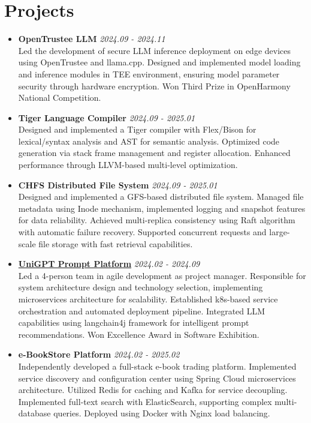 \documentclass[a4paper]{article}
\begin{document}
\section*{Projects}
\begin{itemize}[leftmargin=*,label={},itemsep=0.5em,topsep=0.2em]
\item \textbf{OpenTrustee LLM} \hfill \textit{2024.09 - 2024.11}\\
Led the development of secure LLM inference deployment on edge devices using OpenTrustee and llama.cpp. Designed and implemented model loading and inference modules in TEE environment, ensuring model parameter security through hardware encryption. Won Third Prize in OpenHarmony National Competition.

\item \textbf{Tiger Language Compiler} \hfill \textit{2024.09 - 2025.01}\\
Designed and implemented a Tiger compiler with Flex/Bison for lexical/syntax analysis and AST for semantic analysis. Optimized code generation via stack frame management and register allocation. Enhanced performance through LLVM-based multi-level optimization.

\item \textbf{CHFS Distributed File System} \hfill \textit{2024.09 - 2025.01}\\
Designed and implemented a GFS-based distributed file system. Managed file metadata using Inode mechanism, implemented logging and snapshot features for data reliability. Achieved multi-replica consistency using Raft algorithm with automatic failure recovery. Supported concurrent requests and large-scale file storage with fast retrieval capabilities.

\item \textbf{\href{https://base.sjtu.edu.cn/se/Awards.html}{UniGPT Prompt Platform}} \hfill \textit{2024.02 - 2024.09}\\
Led a 4-person team in agile development as project manager. Responsible for system architecture design and technology selection, implementing microservices architecture for scalability. Established k8s-based service orchestration and automated deployment pipeline. Integrated LLM capabilities using langchain4j framework for intelligent prompt recommendations. Won Excellence Award in Software Exhibition.

\item \textbf{e-BookStore Platform} \hfill \textit{2024.02 - 2025.02}\\
Independently developed a full-stack e-book trading platform. Implemented service discovery and configuration center using Spring Cloud microservices architecture. Utilized Redis for caching and Kafka for service decoupling. Implemented full-text search with ElasticSearch, supporting complex multi-database queries. Deployed using Docker with Nginx load balancing.
\end{itemize}
\end{document}
